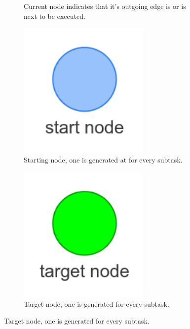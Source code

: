 \begin{figure}[H]
\begin{subfigure}{0.2\textwidth}
    \caption{Current node indicates that it's outgoing edge is or is next to be executed.}%
    \end{subfigure}
    \begin{subfigure}{0.2\textwidth}
    \centering
    \includegraphics[width=0.7\textwidth]{figures/proposed_method/connecting_nodes/legend/starting_node}
    \caption{Starting node, one is generated at for every subtask.}%
    \end{subfigure}
    \begin{subfigure}{0.2\textwidth}
    \centering
    \includegraphics[width=0.7\textwidth]{figures/proposed_method/connecting_nodes/legend/target_node}
    \caption{Target node, one is generated for every subtask.\newline}%
    \end{subfigure}


\end{figure}
